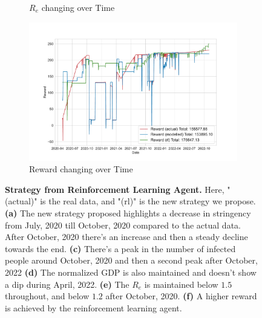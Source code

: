 \documentclass[tikz,fleqn,12pt]{wlscirep}
\begin{document}
\begin{figure}[htbp!]
\begin{subfigure}[t]{0.48\textwidth}
    \caption{$R_e$ changing over Time}
  \end{subfigure}
  \label{fig:176647_rl_r_eff}
  \hfill
  \begin{subfigure}[t]{0.48\textwidth}
    \centering
    \includegraphics[width=\linewidth]{images/176647/rl_reward.pdf}
    \caption{Reward changing over Time}
  \end{subfigure}
  \label{fig:176647_rl_reward}
  \caption{\textbf{Strategy from Reinforcement Learning Agent.} Here, "(actual)" is the real data, and "(rl)" is the new strategy we propose. \textbf{(a)} The new strategy proposed highlights a decrease in stringency from July, 2020 till October, 2020 compared to the actual data. After October, 2020 there's an increase and then a steady decline towards the end. \textbf{(c)} There's a peak in the number of infected people around October, 2020 and then a second peak after October, 2022 \textbf{(d)} The normalized GDP is also maintained and doesn't show a dip during April, 2022. \textbf{(e)} The $R_e$ is maintained below $1.5$ throughout, and below $1.2$ after October, 2020. \textbf{(f)} A higher reward is achieved by the reinforcement learning agent.}
\end{figure}
\end{document}
